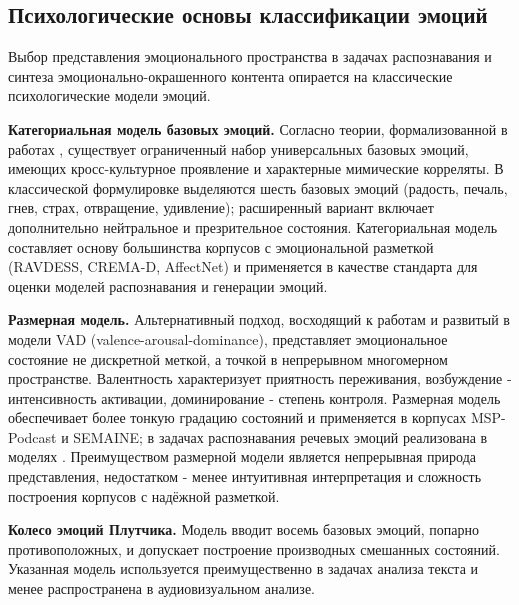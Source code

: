 \documentclass[a4paper, 12pt, oneside, openany]{article}
\begin{document}
\subsection{Психологические основы классификации эмоций}

Выбор представления эмоционального пространства в задачах распознавания и синтеза эмоционально-окрашенного контента опирается на классические психологические модели эмоций.

\textbf{Категориальная модель базовых эмоций.} Согласно теории, формализованной в работах \cite{ekman1992,ekman1978facs}, существует ограниченный набор универсальных базовых эмоций, имеющих кросс-культурное проявление и характерные мимические корреляты. В классической формулировке выделяются шесть базовых эмоций (радость, печаль, гнев, страх, отвращение, удивление); расширенный вариант включает дополнительно нейтральное и презрительное состояния. Категориальная модель составляет основу большинства корпусов с эмоциональной разметкой (RAVDESS, CREMA-D, AffectNet) и применяется в качестве стандарта для оценки моделей распознавания и генерации эмоций.

\textbf{Размерная модель.} Альтернативный подход, восходящий к работам \cite{russell1980} и развитый в модели VAD (valence-arousal-dominance), представляет эмоциональное состояние не дискретной меткой, а точкой в непрерывном многомерном пространстве. Валентность характеризует приятность переживания, возбуждение - интенсивность активации, доминирование - степень контроля. Размерная модель обеспечивает более тонкую градацию состояний и применяется в корпусах MSP-Podcast и SEMAINE; в задачах распознавания речевых эмоций реализована в моделях \cite{wagner2023}. Преимуществом размерной модели является непрерывная природа представления, недостатком - менее интуитивная интерпретация и сложность построения корпусов с надёжной разметкой.

\textbf{Колесо эмоций Плутчика.} Модель \cite{plutchik1980} вводит восемь базовых эмоций, попарно противоположных, и допускает построение производных смешанных состояний. Указанная модель используется преимущественно в задачах анализа текста и менее распространена в аудиовизуальном анализе.
\end{document}
